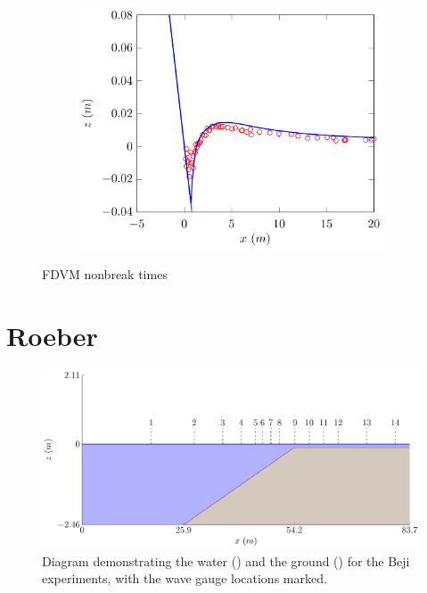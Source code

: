 \begin{figure}
\begin{subfigure}{0.5\textwidth}
		\includegraphics[width=\textwidth]{./chp6/figures/Experiment/Synolakis/H0p0185/FDVM/70s.pdf}
	\end{subfigure}
	\caption{FDVM nonbreak times}
	\label{fig:SynolakisFDVMNoBreak}
\end{figure}




\section{Roeber}

\begin{figure}
	\centering
	\includegraphics[width=\textwidth]{./chp6/figures/Experiment/Roeber/Trial8/WaveTank.pdf}
	\caption{Diagram demonstrating the water () and the ground  () for the Beji experiments, with the wave gauge locations marked.}
	\label{fig:RoeberWT}
\end{figure}

